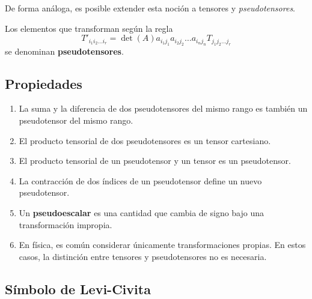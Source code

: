 De forma análoga, es posible extender esta noción a tensores y \emph{pseudotensores}.

\begin{defi}
    Los elementos que transforman según la regla
    \begin{equation}
        T'_{i_1 i_2 \dots i_r} = \det(A) a_{i_1 j_1} a_{i_2 j_2} \dots a_{i_n j_n} T_{j_1 j_2 \dots j_r} 
    \end{equation}
    se denominan \textbf{pseudotensores}.
\end{defi}

\subsection{Propiedades}

\begin{enumerate}
    \item La suma y la diferencia de dos pseudotensores del mismo rango es también un pseudotensor del mismo rango.
    \item El producto tensorial de dos pseudotensores es un tensor cartesiano.
    \item El producto tensorial de un pseudotensor y un tensor es un pseudotensor.
    \item La contracción de dos índices de un pseudotensor define un nuevo pseudotensor.
    \item Un \textbf{pseudoescalar} es una cantidad que cambia de signo bajo una transformación impropia.
    \item En física, es común considerar únicamente transformaciones propias. En estos casos, la distinción entre tensores y pseudotensores no es necesaria.
\end{enumerate}

\subsection{Símbolo de Levi-Civita}

